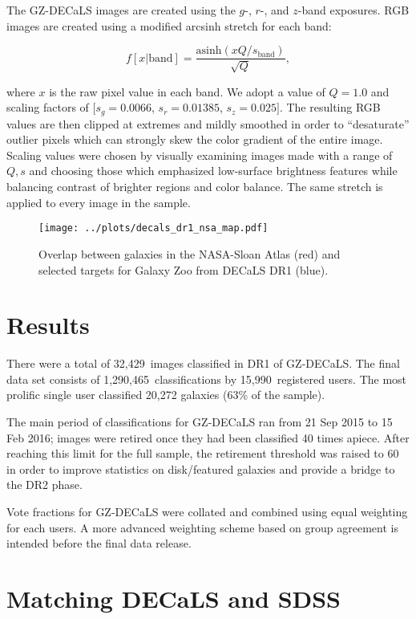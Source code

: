 \documentclass[iop,apj,tighten]{emulateapj}
\begin{document}
The GZ-DECaLS images are created using the $g$-, $r$-, and $z$-band exposures. RGB images are created using a modified arcsinh stretch \citep{lup04} for each band:

\begin{equation}
f[x|\text{band}]=\frac{\text{asinh}(x Q/s_\text{band})}{\sqrt{Q}},
\end{equation}

\noindent where $x$ is the raw pixel value in each band. We adopt a value of $Q=1.0$ and scaling factors of $[s_g = 0.0066$, $s_r = 0.01385$, $s_z = 0.025]$. The resulting RGB values are then clipped at extremes and mildly smoothed in order to ``desaturate'' outlier pixels which can strongly skew the color gradient of the entire image. Scaling values were chosen by visually examining images made with a range of $Q,s$ and choosing those which emphasized low-surface brightness features while balancing contrast of brighter regions and color balance. The same stretch is applied to every image in the sample. 

\begin{figure*}
\centering
\texttt{[image: ../plots/decals\_dr1\_nsa\_map.pdf]}
\caption{Overlap between galaxies in the NASA-Sloan Atlas (red) and selected targets for Galaxy Zoo from DECaLS DR1 (blue).\label{fig:dr1_map}}
\end{figure*}

\section{Results}

There were a total of 32,429~images classified in DR1 of GZ-DECaLS. The final data set consists of 1,290,465~classifications by 15,990~registered users. The most prolific single user classified 20,272 galaxies (63\% of the sample).

The main period of classifications for GZ-DECaLS ran from 21 Sep 2015 to 15 Feb 2016; images were retired once they had been classified 40 times apiece. After reaching this limit for the full sample, the retirement threshold was raised to 60 in order to improve statistics on disk/featured galaxies and provide a bridge to the DR2 phase.

Vote fractions for GZ-DECaLS were collated and combined using equal weighting for each users. A more advanced weighting scheme based on group agreement is intended before the final data release.

\section{Matching DECaLS and SDSS}
\end{document}

